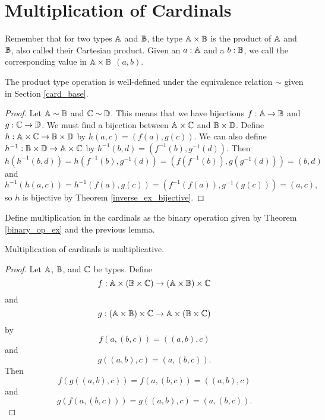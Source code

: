 \documentclass[../../math.tex]{subfiles}
\begin{document}
\section{Multiplication of Cardinals}

Remember that for two types $\mathbb{A}$ and $\mathbb{B}$, the type $\mathbb{A} \times \mathbb{B}$ is the
product of $\mathbb{A}$ and $\mathbb{B}$, also called their Cartesian product.  Given an $a :
\mathbb{A}$ and a $b : \mathbb{B}$, we call the corresponding value in $\mathbb{A} \times \mathbb{B}$ $(a, b)$.

\begin{lemma}
    The product type operation is well-defined under the equivalence relation
    $\sim$ given in Section \ref{card_base}.
\end{lemma}
\begin{proof}
    Let $\mathbb{A} \sim \mathbb{B}$ and $\mathbb{C} \sim \mathbb{D}$.  This means that we have bijections $f :
    \mathbb{A} \to \mathbb{B}$ and $g : \mathbb{C} \to \mathbb{D}$.  We must find a bijection between $\mathbb{A} \times
    \mathbb{C}$ and $\mathbb{B} \times \mathbb{D}$.  Define $h : \mathbb{A} \times \mathbb{C} \to \mathbb{B} \times \mathbb{D}$ by $h(a,
    c) = (f(a), g(c))$.  We can also define $h^{-1} : \mathbb{B} \times \mathbb{D} \to \mathbb{A} \times
    \mathbb{C}$ by $h^{-1}(b, d) = (f^{-1}(b), g^{-1}(d))$.  Then
    \[
        h(h^{-1}(b, d))
        = h(f^{-1}(b), g^{-1}(d))
        = (f(f^{-1}(b)), g(g^{-1}(d)))
        = (b, d)
    \]
    and
    \[
        h^{-1}(h(a, c))
        = h^{-1}(f(a), g(c))
        = (f^{-1}(f(a)), g^{-1}(g(c)))
        = (a, c),
    \]
    so $h$ is bijective by Theorem \ref{inverse_ex_bijective}.
\end{proof}

\begin{instance}
    Define multiplication in the cardinals as the binary operation given by
    Theorem \ref{binary_op_ex} and the previous lemma.
\end{instance}

\begin{instance}
    Multiplication of cardinals is multiplicative.
\end{instance}
\begin{proof}
    Let $\mathbb{A}$, $\mathbb{B}$, and $\mathbb{C}$ be types.  Define
    \[
        f : \mathbb{A} \times (\mathbb{B} \times \mathbb{C}) \to (\mathbb{A} \times \mathbb{B}) \times \mathbb{C}
    \]
    and
    \[
        g : (\mathbb{A} \times \mathbb{B}) \times \mathbb{C} \to \mathbb{A} \times (\mathbb{B} \times \mathbb{C})
    \]
    by
    \[
        f(a, (b, c)) = ((a, b), c)
    \]
    and
    \[
        g((a, b), c) = (a, (b, c)).
    \]
    Then
    \[
        f(g((a, b), c)) = f(a, (b, c)) = ((a, b), c)
    \]
    and
    \[
        g(f(a, (b, c))) = g((a, b), c) = (a, (b, c)).
    \]
\end{proof}
\end{document}
